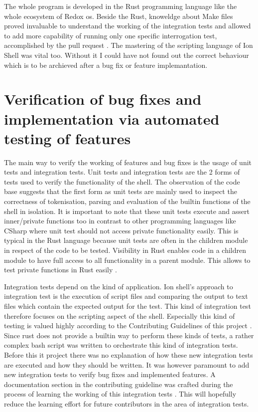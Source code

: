 The whole program is developed in the Rust programming language like the whole ecosystem of Redox os.
Beside the Rust, knoweldge about Make files proved invaluable to understand the working of the integration tests and
allowed to add more capability of running only one specific interrogation test, accomplished by the pull request \cite{pr_single_test_selectable}.
The mastering of the scripting language of Ion Shell was vital too. Without it I could have not found out the correct behaviour
which is to be archieved after a bug fix or feature implemantation.

\section{Verification of bug fixes and implementation via automated testing of features}\label{impl:integration_test}

The main way to verify the working of features and bug fixes is the usage of unit tests and integration tests.
Unit tests and integration tests are the 2 forms of tests used to verify the functionality of the shell.
The observation of the code base suggests that the first form as unit tests are mainly used to inspect the correctness of tokenisation, parsing and
evaluation of the builtin functions of the shell in isolation.
It is important to note that these unit tests execute and assert inner/private functions too
in contrast to other programming languages like CSharp where unit test should not access private functionality easily.
This is typical in the Rust language because unit tests are often in the children module in respect of the code to be tested.
Visibility in Rust enables code in a children module to have full access to all functionality in a parent module.
This allows to test private functions in Rust easily \cite{rust_testing_private_function}.

Integration tests depend on the kind of application.
Ion shell's approach to integration test is the execution of script files
and comparing the output to text files which contain the expected output for the test.
This kind of integration test therefore focuses on the scripting aspect of the shell.
Especially this kind of testing is valued highly according to the Contributing Guidelines of this project \cite{ion_shell_contributing}.
Since rust does not provide a builtin way to perform these kinds of tests,
a rather complex bash script was written to orchestrate this kind of integration tests.
Before this it project there was no explanation of how these new integration tests are executed and how they should be written.
It was however paramount to add new integration tests to verify bug fixes and implemented features.
A documentation section in the contributing guideline was crafted during the process of
learning the working of this integration tests \cite{ion_shell_contributing}.
This will hopefully reduce the learning effort for future contributors in the area of integration tests.

